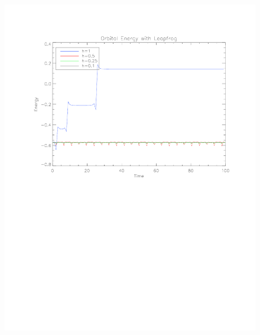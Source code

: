 \documentclass[11pt]{article}
\begin{document}
\begin{figure}
\centering
\includegraphics[scale = 0.7]{LFEnergy.pdf}
\caption{}
\end{figure}
\end{document}
